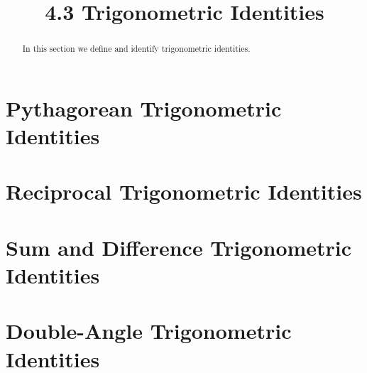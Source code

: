 \documentclass[handout]{ximera}
\title{4.3 Trigonometric Identities}
\begin{document}
\begin{abstract}
In this section we define and identify trigonometric identities.
\end{abstract}

\maketitle


\section{Pythagorean Trigonometric Identities}




\section{Reciprocal Trigonometric Identities}


\section{Sum and Difference Trigonometric Identities}

\section{Double-Angle Trigonometric Identities}
\end{document}
